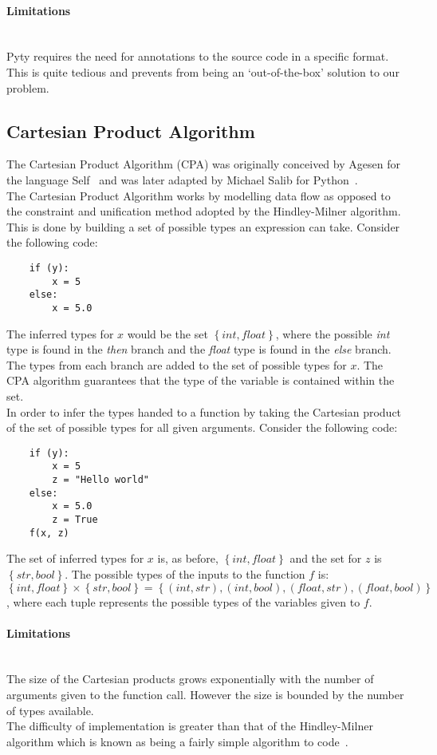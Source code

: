 \documentclass[12pt, titlepage]{article}
\begin{document}
\paragraph{Limitations}\mbox{}\\
Pyty requires the need for annotations to the source code in a specific format. This is quite tedious and prevents from being an `out-of-the-box' solution to our problem.

\subsection{Cartesian Product Algorithm}
The Cartesian Product Algorithm (CPA) was originally conceived by Agesen for the language Self~\cite{agesen95} and was later adapted by Michael Salib for Python~\cite{starkiller}. \\
The Cartesian Product Algorithm works by modelling data flow as opposed to the constraint and unification method adopted by the Hindley-Milner algorithm. This is done by building a set of possible types an expression can take. Consider the following code:
\begin{lstlisting}
	if (y):	
		x = 5     
	else:
		x = 5.0  
\end{lstlisting}
The inferred types for $x$ would be the set $\left\{ {int, float}\right\}$, where the possible \textit{int} type is found in the \textit{then} branch and the \textit{float} type is found in the \textit{else} branch. The types from each branch are added to the set of possible types for $x$. The CPA algorithm guarantees that the type of the variable is contained within the set. \\
In order to infer the types handed to a function by taking the Cartesian product of the set of possible types for all given arguments. Consider the following code:
\begin{lstlisting}
	if (y):	
		x = 5 
		z = "Hello world"    
	else:
		x = 5.0 
		z = True
	f(x, z)
\end{lstlisting}
The set of inferred types for $x$ is, as before, $\left\{ {int, float}\right\}$ and the set for $z$ is $\left\{ {str, bool}\right\}$. The possible types of the inputs to the function $f$ is: $\left\{ {int, float}\right\} \times \left\{ {str, bool}\right\} = \left\{ {(int, str), (int, bool), (float, str), (float, bool)}\right\}$, where each tuple represents the possible types of the variables given to $f$.
\paragraph*{Limitations}\mbox{}\\
The size of the Cartesian products grows exponentially with the number of arguments given to the function call. However the size is bounded by the number of types available. \\
The difficulty of implementation is greater than that of the Hindley-Milner algorithm which is known as being a fairly simple algorithm to code~\cite{jones95}.
\end{document}
